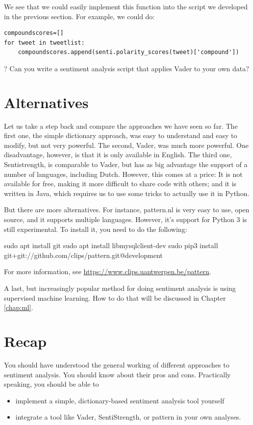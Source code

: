 \documentclass[a4paper,12pt]{book}
\let\oldquote\quote
\let\endoldquote\endquote
\newenvironment{question}{
\oldquote\footnotesize
\lettrine[lines=3]{\color{BrickRed}?}{ }}
{\endoldquote}
\begin{document}
We see that we could easily implement this function into the script we developed in the previous section. For example, we could do:

\begin{lstlisting}
compoundscores=[]
for tweet in tweetlist:
    compoundscores.append(senti.polarity_scores(tweet)['compound'])
\end{lstlisting}

\begin{question}
	Can you write a sentiment analysis script that applies Vader to your own data?
\end{question}


\section{Alternatives}
Let us take a step back and compare the approaches we have seen so far. The first one, the simple dictionary approach, was easy to understand and easy to modify, but not very powerful. The second, Vader, was much more powerful. One disadvantage, however, is that it is only available in English. The third one, Sentistrength, is comparable to Vader, but has as big advantage the support of a number of languages, including Dutch. However, this comes at a price: It is not available for free, making it more difficult to share code with others; and it is written in Java, which requires us to use some tricks to actually use it in Python.

But there are more alternatives. For instance, pattern.nl \citep{DeSmedt2012} is very easy to use, open source, and it supports multiple languages. However, it's support for Python 3 is still experimental. 
To install it, you need to do the following:
\begin{lstlistingbash}
sudo apt install git
sudo apt install libmysqlclient-dev
sudo pip3 install git+git://github.com/clips/pattern.git@development
\end{lstlistingbash}

For more information, see \url{https://www.clips.uantwerpen.be/pattern}.

A last, but increasingly popular method for doing sentiment analysis is using supervised machine learning. How to do that will be discussed in Chapter \ref{chap:ml}.


\section{Recap}
You should have understood the general working of different approaches to sentiment analysis. You should know about their pros and cons. Practically speaking, you should be able to
\begin{itemize}
	\item implement a simple, dictionary-based sentiment analysis tool yourself
	\item integrate a tool like Vader, SentiStrength, or pattern in your own analyses.
\end{itemize}
\end{document}
